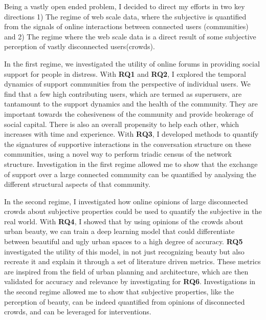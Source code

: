 \vspace{0.5cm}
\noindent{}
\vspace{0.5cm} 

Being a vastly open ended problem, I decided to direct my efforts in two key directions 1) The regime of web scale data, where the subjective is quantified from the signals of online interactions between connected users (communities) and 2) The regime where the web scale data is a direct result of some subjective perception of vastly disconnected users(crowds). 

In the first regime, we investigated the utility of online forums in providing social support for people in distress. With \textbf{RQ1} and \textbf{RQ2}, I explored the temporal dynamics of support communities from the perspective of individual users. We find that a few high contributing users, which are termed as superusers, are tantamount to the support dynamics and the health of the community. They are important towards the cohesiveness of the community and provide brokerage of social capital. There is also an overall propensity to help each other, which increases with time and experience. With \textbf{RQ3}, I developed methods to quantify the signatures of supportive interactions in the conversation structure on these communities, using a novel way to perform triadic census of the network structure. Investigation in the first regime allowed me to show that the exchange of support over a large connected community can be quantified by analysing the different structural aspects of that community. 

In the second regime, I investigated how online opinions of large disconnected crowds about subjective properties could be used to quantify the subjective in the real world. With \textbf{RQ4}, I showed that by using opinions of the crowds about urban beauty, we can train a deep learning model that could differentiate between beautiful and ugly urban spaces to a high degree of accuracy. \textbf{RQ5} investigated the utility of this model, in not just recognizing beauty but also recreate it and explain it through a set of literature driven metrics. These metrics are inspired from the field of urban planning and architecture, which are then validated for accuracy and relevance by investigating for \textbf{RQ6}. Investigations in the second regime allowed me to show that subjective properties, like the perception of beauty, can be indeed quantified from opinions of disconnected crowds, and can be leveraged for interventions. 

